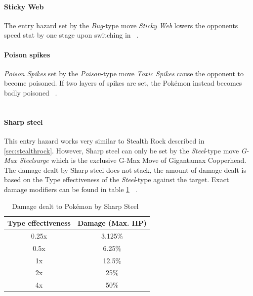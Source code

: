 \paragraph{Sticky Web}
The entry hazard set by the \textit{Bug}-type move \textit{Sticky Web} lowers the
opponents speed stat by one stage upon switching in ~\autocite{Bulbapedia:StickyWeb}. \\

\paragraph{Poison spikes}
\label{sec:poison-spikes}
\textit{Poison Spikes} set by the \textit{Poison}-type move \textit{Toxic Spikes}
cause the opponent to become poisoned. If two layers of spikes are set, the
Pokémon instead becomes badly poisoned ~\autocite{Bulbapedia:ToxicSpikes}. \\
 \\

\paragraph{Sharp steel}
This entry hazard works very similar to Stealth Rock described in \ref{sec:stealthrock}.
However, Sharp steel can only be set by the \textit{Steel}-type move
\textit{G-Max Steelsurge} which is the exclusive G-Max Move of Gigantamax Copperhead.
The damage dealt by Sharp steel does not stack, the amount of damage dealt is
based on the Type effectiveness of the \textit{Steel}-type against the target.
Exact damage modifiers can be found in table \ref{tab:sharp-steel-damage}
~\autocite{Bulbapedia:GMaxSteelsurge}.
\begin{table}[h]
	\centering
	\begin{tabular}{|c|c|}
		\hline
		\textbf{Type effectiveness} & \textbf{Damage (Max. \ac{HP}}) \\
		\hline 
		0.25x & 3.125\% \\ 
		\hline 
		0.5x &  6.25\% \\ 
		\hline 
		1x & 12.5\% \\
		\hline
		2x & 25\% \\
		\hline
		4x & 50\% \\
		\hline
	\end{tabular} 
	\caption{Damage dealt to Pokémon by Sharp Steel~\autocite{Bulbapedia:GMaxSteelsurge}}
	\label{tab:sharp-steel-damage}
\end{table}

